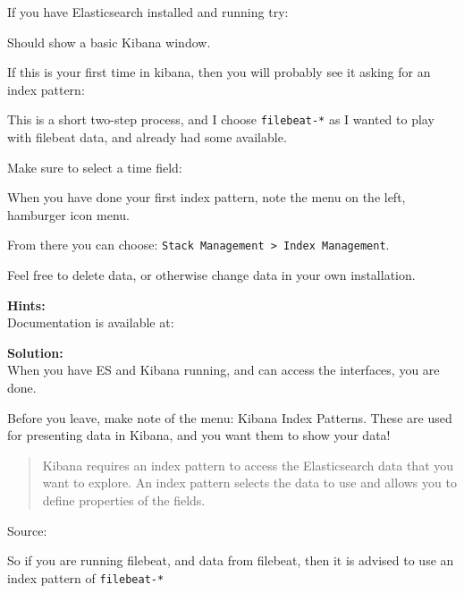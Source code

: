 \documentclass[a4paper,11pt,notitlepage]{report}
\begin{document}
If you have Elasticsearch installed and running try: 

Should show a basic Kibana window.


If this is your first time in kibana, then you will probably see it asking for an index pattern:

This is a short two-step process, and I choose \verb+filebeat-*+ as I wanted to play with filebeat data, and already had some available.


Make sure to select a time field:


When you have done your first index pattern, note the menu on the left, hamburger icon menu.

From there you can choose: \verb+Stack Management > Index Management+.


Feel free to delete data, or otherwise change data in your own installation.



{\bf Hints:}\\
Documentation is available at:\\

{\bf Solution:}\\
When you have ES and Kibana running, and can access the interfaces, you are done.

Before you leave, make note of the menu: Kibana Index Patterns. These are used for presenting data in Kibana, and you want them to show your data!

\begin{quote}
Kibana requires an index pattern to access the Elasticsearch data that you want to explore. An index pattern selects the data to use and allows you to define properties of the fields.
\end{quote}
Source: 

So if you are running filebeat, and data from filebeat, then it is advised to use an index pattern of \verb+filebeat-*+

\end{document}
